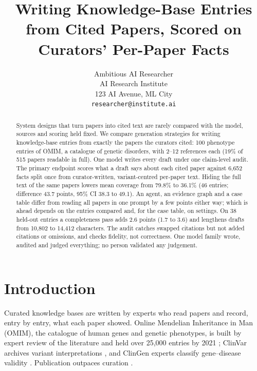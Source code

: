 \documentclass{article} %
\title{Writing Knowledge-Base Entries from Cited Papers, Scored on Curators' Per-Paper Facts}
\author{Ambitious AI Researcher\\
AI Research Institute\\
123 AI Avenue, ML City\\
\texttt{researcher@institute.ai}
}
\begin{document}
\maketitle

\begin{abstract}
System designs that turn papers into cited text are rarely compared with the model, sources and scoring held fixed. We compare generation strategies for writing knowledge-base entries from exactly the papers the curators cited: 100 phenotype entries of OMIM, a catalogue of genetic disorders, with 2--12 references each (19\% of 515 papers readable in full). One model writes every draft under one claim-level audit. The primary endpoint scores what a draft says about each cited paper against 6,652 facts split once from curator-written, variant-centred per-paper text. Hiding the full text of the same papers lowers mean coverage from 79.8\% to 36.1\% (46 entries; difference 43.7 points, 95\% CI 38.3 to 49.1). An agent, an evidence graph and a case table differ from reading all papers in one prompt by a few points either way; which is ahead depends on the entries compared and, for the case table, on settings. On 38 held-out entries a completeness pass adds 2.6 points (1.7 to 3.6) and lengthens drafts from 10,802 to 14,412 characters. The audit catches swapped citations but not added citations or omissions, and checks fidelity, not correctness. One model family wrote, audited and judged everything; no person validated any judgement.
\end{abstract}

\section{Introduction}
\label{sec:intro}
Curated knowledge bases are written by experts who read papers and record, entry by entry, what each paper showed. Online Mendelian Inheritance in Man (OMIM), the catalogue of human genes and genetic phenotypes, is built by expert review of the literature and held over 25,000 entries by 2021 \citep{Amberger2014OmimorgOnline,amberger2019omim,hamosh2021online}; ClinVar archives variant interpretations \citep{Landrum2017ClinvarImproving,landrum2025clinvar}, and ClinGen experts classify gene--disease validity \citep{strande2017evaluating}. Publication outpaces curation \citep{caufield2024curategpt,Green2023LitsummLarge}.
\end{document}
